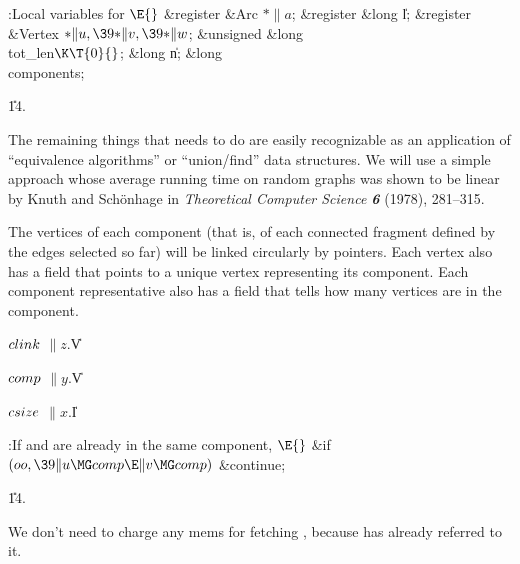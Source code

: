 \Y\B\4:Local variables for \X${}\E{}$\6
\&{register} \&{Arc} ${}{*}\|a{}$;\6
\&{register} \&{long} \|l;\6
\&{register} \&{Vertex} ${}{*}\|u,\39{*}\|v,\39{*}\|w{}$;\6
\&{unsigned} \&{long} \\{tot\_len}${}\K\T{0}{}$;\6
\&{long} \|n;\6
\&{long} \\{components};\par
\U14.\fi

The remaining things that  needs to do are easily
recognizable
as an application of ``equivalence algorithms'' or ``union/find''
data structures. We will use a simple approach whose average running
time on random graphs was shown to be linear by Knuth and Sch\"onhage
in {\sl Theoretical Computer Science\/ \bf 6} (1978), 281--315.

The vertices of each component (that is, of each connected fragment defined by
the edges selected so far) will be linked circularly by 
pointers.
Each vertex also has a  field that points to a unique vertex
representing its component. Each component representative also has
a  field that tells how many vertices are in the component.

\Y\B\4\D$\\{clink}$ \5
$\|z.{}$\|V\par
\B\4\D$\\{comp}$ \5
$\|y.{}$\|V\par
\B\4\D$\\{csize}$ \5
$\|x.{}$\|I\par
\Y\B\4:If  and  are already in the same component, \X${}\E{}$\6
\&{if} ${}(\\{oo},\39\|u\MG\\{comp}\E\|v\MG\\{comp}){}$\1\5
\&{continue};\2\par
\U14.\fi

We don't need to charge any mems for fetching ,
because
 has already referred to it.

